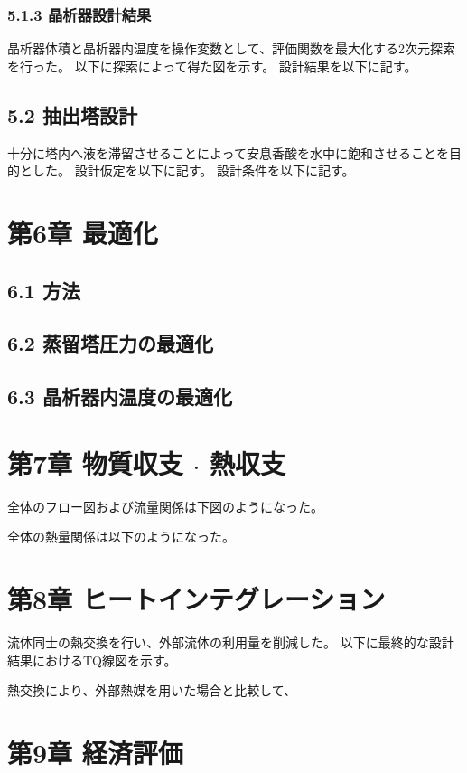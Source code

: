 \documentclass[a4j]{jsarticle}
\begin{document}
\subsection*{5.1.3 晶析器設計結果}
晶析器体積と晶析器内温度を操作変数として、評価関数を最大化する2次元探索を行った。
以下に探索によって得た図を示す。
設計結果を以下に記す。

\section*{5.2 抽出塔設計}
十分に塔内へ液を滞留させることによって安息香酸を水中に飽和させることを目的とした。
設計仮定を以下に記す。
設計条件を以下に記す。

\chapter*{第6章 最適化}
\section*{6.1 方法}

\section*{6.2 蒸留塔圧力の最適化}

\section*{6.3 晶析器内温度の最適化}

\chapter*{第7章 物質収支 $\cdot$ 熱収支}
全体のフロー図および流量関係は下図のようになった。

全体の熱量関係は以下のようになった。

\chapter*{第8章 ヒートインテグレーション}
流体同士の熱交換を行い、外部流体の利用量を削減した。
以下に最終的な設計結果におけるTQ線図を示す。

熱交換により、外部熱媒を用いた場合と比較して、

\chapter*{第9章 経済評価}
\end{document}
